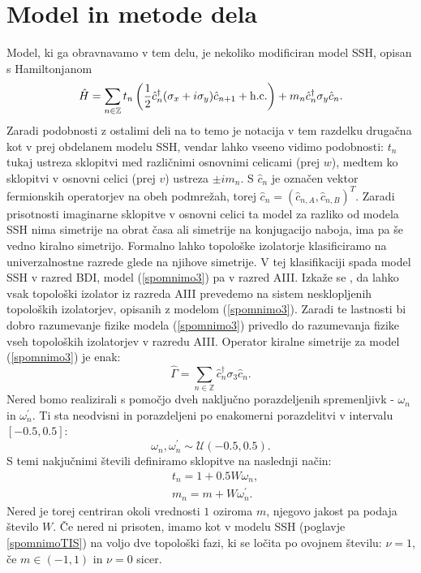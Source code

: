 \chapter{Model in metode dela}
Model, ki ga obravnavamo v tem delu, je nekoliko modificiran model SSH, opisan s Hamiltonjanom
\begin{equation} \label{spomnimo3}
\hat{H} = \sum_{n \in \mathbb{Z}} t_n \left( \frac{1}{2} \hat{c}_n^\dagger (\sigma_x + i \sigma_y) \hat{c}_{n+1} + \textup{h.c.} \right) + m_n \hat{c}_n^\dagger \sigma_y \hat{c}_n.
\end{equation}
Zaradi podobnosti z ostalimi deli na to temo \cite{mondragon} je notacija v tem razdelku drugačna kot v prej obdelanem modelu SSH, vendar lahko vseeno vidimo podobnosti: $t_n$ tukaj ustreza sklopitvi med različnimi osnovnimi celicami (prej $w$), medtem ko sklopitvi v osnovni celici (prej $v$) ustreza $\pm i m_n$. S $\hat{c}_n$ je označen vektor fermionskih operatorjev na obeh podmrežah, torej
$\hat{c}_n = (\hat{c}_{n,A} , \hat{c}_{n,B})^T$.
Zaradi prisotnosti imaginarne sklopitve v osnovni celici ta model za razliko od modela SSH nima simetrije na obrat časa ali simetrije na konjugacijo naboja, ima pa še vedno kiralno simetrijo. Formalno lahko topološke izolatorje klasificiramo na univerzalnostne razrede glede na njihove simetrije. V tej klasifikaciji spada model SSH v razred BDI, model (\ref{spomnimo3}) pa v razred AIII. Izkaže se \cite{mondragon}, da lahko vsak topološki izolator iz razreda AIII prevedemo na sistem nesklopljenih topoloških izolatorjev, opisanih z modelom (\ref{spomnimo3}). Zaradi te lastnosti bi dobro razumevanje fizike modela (\ref{spomnimo3}) privedlo do razumevanja fizike vseh topoloških izolatorjev v razredu AIII.
Operator kiralne simetrije za model (\ref{spomnimo3}) je enak:
\begin{equation}
\hat{\Gamma} = \sum_{n  \in \mathbb{Z}} \hat{c}_n^\dagger \sigma_3 \hat{c}_n.
\end{equation}
Nered bomo realizirali s pomočjo dveh naključno porazdeljenih spremenljivk - $\omega_n$ in $\omega_n^\prime$. Ti sta neodvisni in porazdeljeni po enakomerni porazdelitvi v intervalu $[ -0.5 , 0.5]$:
\begin{equation}
\omega_n, \omega_n^\prime \sim \mathcal{U}(-0.5,0.5).
\end{equation}
S temi nakjučnimi števili definiramo sklopitve na naslednji način:
\begin{align} \label{sklopitvi}
&t_n = 1 + 0.5 W \omega_n, \\
&m_n = m + W \omega_n^\prime. \label{sklopitvi2}
\end{align}
Nered je torej centriran okoli vrednosti $1$ oziroma $m$, njegovo jakost pa podaja število $W$.
Če nered ni prisoten, imamo kot v modelu SSH (poglavje \ref{spomnimoTIS}) na voljo dve topološki fazi, ki se ločita po ovojnem številu: $\nu=1$, če $m \in (-1,1)$ in $\nu=0$ sicer.

